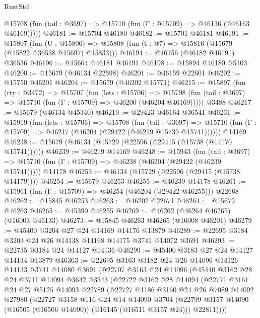 \begin{lexlean}{RustStd}
\begin{coremodule}
      @15708 (fun (tail : @3697) => @15710 (fun (Γ : @15709) => @46136 (@46163 @46169)))))
@46181 := @15704 @46180
@46182 := @15701 @46181
@46191 := @15807
    (fun (U : @15806) => @15808 (fun (t : @7) => @15816 (@15679 (@15822 @36538 @15697) @15833)))
@46194 := @46156 (@46182 @46191) @36536
@46196 := @15664 @46181 @46191
@46198 := @15894 @46180 @5103
@46200 := @15679 (@46134 @22598)
@46201 := @46159 @22601
@46202 := @15750 @46201
@46204 := @15679 (@46202 @15771)
@46215 := @15897
    (fun (rty : @3472) =>
    @15707
      (fun (lets : @15706) =>
      @15708 (fun (tail : @3697) => @15710 (fun (Γ : @15709) => @46200 (@46204 @46169)))))
    @3488
@46217 := @15679 (@46134 @45340)
@46219 := @29423 @46164 @36541
@46231 := @15919
    (fun (lets : @15706) =>
    @15708
      (fun (tail : @3697) =>
      @15710 (fun (Γ : @15709) => @46217 (@46204 (@29422 (@46219 @15739 @15741))))))
    @14169
@46238 := @15679 (@46134 (@15729 (@22596 (@29415 (@15738 (@14170 @15741))))))
@46239 := @46219 @14169
@46248 := @15943
    (fun (tail : @3697) => @15710 (fun (Γ : @15709) => @46238 (@46204 (@29422 (@46239 @15741)))))
    @14178
@46253 := @46134 (@15729 (@22596 (@29415 (@15738 @14179))))
@46254 := @15679 @46253
@46255 := @46239 @14178
@46261 := @15961 (fun (Γ : @15709) => @46254 (@46204 (@29422 @46255))) @22668
@46262 := @15845 @46253
@46263 := @46202 @22671
@46264 := @15679 @46263
@46265 := @45390 @46255
@46269 := @46262 (@46264 @46265) (@16003 @46133)
@46273 := @15845 @46263 @46265 (@16008 @46201)
@46279 := @45400 @3204 @27 @24 @14169 @14176 @13879
@46289 := @22695 @3184 @3203 @24 @26 @14138 @14168 @14175 @3741 @14072 @3691
@46293 := @22735 @3184 @24 @14127 @14136
@46299 := @45400 @3183 @27 @24 @14127 @14134 @13879
@46363 := @22695
    @3163
    @3182
    @24
    @26
    @14096
    @14126
    @14133
    @3741
    @14080
    @3691
    (@22707
      @3163
      @24
      @14096
      (@45440
        @3162
        @28
        @24
        @3711
        @14094
        @3642
        @3343
        (@22722
          @3162
          @28
          @14094
          (@22771
            @3161
            @24
            @27
            @5125
            @14093
            @22789
            (@22727
              @1186
              @3160
              @24
              @26
              @7089
              @14092
              @27980
              (@22727
                @3158
                @116
                @24
                @14
                @14090
                @3704
                (@22799 @3157 @14090 (@16505 (@16506 @14090)) (@16145 (@16511 @3157 @24)))
                @22811))))

\end{coremodule}
\end{lexlean}
